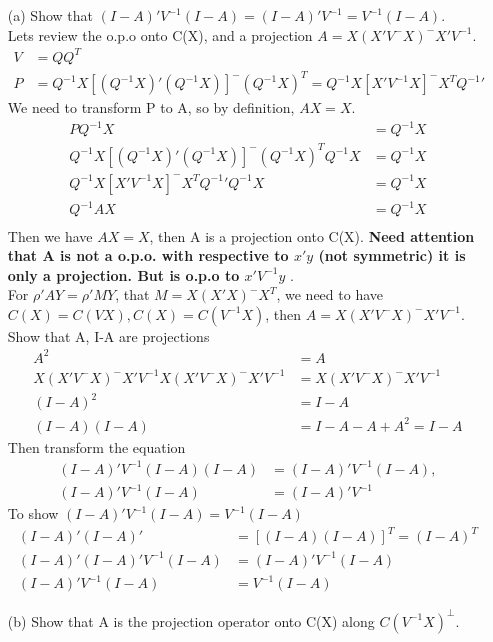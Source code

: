 \documentclass{article}
\begin{document}
\begin{itemize}
    \item [(a)] Show that $(I-A)'V^{-1}(I-A) = (I-A)'V^{-1} = V^{-1}(I-A)$. \\
    Lets review the o.p.o onto C(X), and a projection $A =X(X'V^-X)^-X'V^{-1}$.
\begin{align*}
 V &= QQ^{T}\\
 P &= Q^{-1}X [(Q^{-1}X)' (Q^{-1}X)]^{-} (Q^{-1}X)^{T} = Q^{-1}X [X' V^{-1}X]^- X^{T} Q^{-1} '
\end{align*}     
We need to transform P to A, so by definition, $AX = X$. 
\begin{align*}
 P Q^{-1}X &= Q^{-1}X \\
 Q^{-1}X [(Q^{-1}X)' (Q^{-1}X)]^{-} (Q^{-1}X)^{T} Q^{-1}X &= Q^{-1}X\\
 Q^{-1}X [X' V^{-1}X]^{-} X^T Q^{-1}'Q^{-1}X &= Q^{-1}X\\
 Q^{-1} A X &= Q^{-1}X\\
\end{align*}  
Then we have $AX = X$, then A is a projection onto C(X). \textbf{Need attention that A is not a o.p.o. with respective to $x'y$ (not symmetric) it is only a projection. But is o.p.o to $x' V^{-1}y$ }.\\
For $\rho'A Y = \rho' MY$, that $M= X(X'X)^{-} X^{T}$, we need to have $C(X) = C(VX), C(X) = C(V^{-1}X)$, then $A =X(X'V^-X)^-X'V^{-1}$.\\
Show that A, I-A are projections
\begin{align*}
A^2 &= A\\
X(X'V^-X)^-X'V^{-1} X(X'V^-X)^-X'V^{-1} &= X(X'V^-X)^-X'V^{-1}\\
(I-A)^2 &= I-A \\
(I-A)(I-A) &= I-A-A + A^2 = I-A
\end{align*}  
Then transform the equation
\begin{align*}
(I-A)'V^{-1}(I-A)(I-A) &= (I-A)'V^{-1}(I-A), \\
(I-A)'V^{-1}(I-A) &= (I-A)'V^{-1} 
\end{align*} 
To show $(I-A)'V^{-1}(I-A) = V^{-1}(I-A)$
\begin{align*}
(I-A)'(I-A)' &= [(I-A)(I-A)]^T = (I-A)^T\\
(I-A)'(I-A)'V^{-1}(I-A) &= (I-A)'V^{-1}(I-A) \\
(I-A)'V^{-1}(I-A) &= V^{-1}(I-A) 
\end{align*} 
\item[(b)] Show that A is the projection operator onto C(X) along $C(V^{-1} X)^{\perp}$.

\end{itemize}
\end{document}
